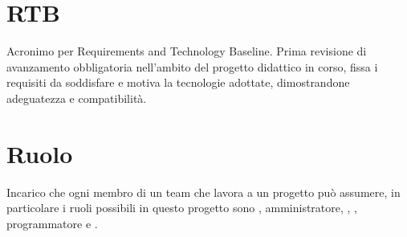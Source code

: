 \section{RTB}\label{sec:Requirements and Technology Baseline}
Acronimo per Requirements and Technology Baseline. Prima revisione di avanzamento obbligatoria nell'ambito del progetto didattico in corso, fissa i requisiti da soddisfare e motiva la tecnologie adottate, dimostrandone adeguatezza e compatibilità.
\section{Ruolo}\label{sec:Ruoli}
Incarico che ogni membro di un team che lavora a un progetto può assumere, in particolare i ruoli possibili in questo progetto sono , amministratore, , , programmatore e .
